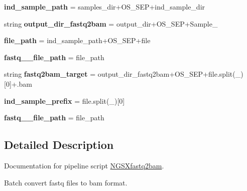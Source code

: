 \begin{DoxyCompactItemize}
\item 
{\bfseries ind\+\_\+sample\+\_\+path} = samples\+\_\+dir+O\+S\+\_\+\+S\+EP+ind\+\_\+sample\+\_\+dir\hypertarget{namespaceNGSXfastq2bam_a9e15a12f170cee194d3ddb857cd9eb90}{}\label{namespaceNGSXfastq2bam_a9e15a12f170cee194d3ddb857cd9eb90}

\item 
string {\bfseries output\+\_\+dir\+\_\+fastq2bam} = output\+\_\+dir+O\+S\+\_\+\+S\+EP+\textquotesingle{}Sample\+\_\+\textquotesingle{}\hypertarget{namespaceNGSXfastq2bam_a056b8c8bda81e50d71bde02b138bf02d}{}\label{namespaceNGSXfastq2bam_a056b8c8bda81e50d71bde02b138bf02d}

\item 
{\bfseries file\+\_\+path} = ind\+\_\+sample\+\_\+path+O\+S\+\_\+\+S\+EP+file\hypertarget{namespaceNGSXfastq2bam_aa54c2255c19ea6a87e63ddccdd97bcce}{}\label{namespaceNGSXfastq2bam_aa54c2255c19ea6a87e63ddccdd97bcce}

\item 
{\bfseries fastq\+\_\+\_\+file\+\_\+path} = file\+\_\+path\hypertarget{namespaceNGSXfastq2bam_a7e07e6cfe0a20940e18faf67fbc126cd}{}\label{namespaceNGSXfastq2bam_a7e07e6cfe0a20940e18faf67fbc126cd}

\item 
string {\bfseries fastq2bam\+\_\+target} = output\+\_\+dir\+\_\+fastq2bam+O\+S\+\_\+\+S\+EP+file.\+split(\textquotesingle{}\+\_\+\textquotesingle{})\mbox{[}0\mbox{]}+\textquotesingle{}.bam\textquotesingle{}\hypertarget{namespaceNGSXfastq2bam_aacfb7434907a2b45c466b5ba6eff1dd7}{}\label{namespaceNGSXfastq2bam_aacfb7434907a2b45c466b5ba6eff1dd7}

\item 
{\bfseries ind\+\_\+sample\+\_\+prefix} = file.\+split(\textquotesingle{}\+\_\+\textquotesingle{})\mbox{[}0\mbox{]}\hypertarget{namespaceNGSXfastq2bam_ae37b44984b816de0be0aa4788b4f22b2}{}\label{namespaceNGSXfastq2bam_ae37b44984b816de0be0aa4788b4f22b2}

\item 
{\bfseries fastq\+\_\+\_\+file\+\_\+path} = file\+\_\+path\hypertarget{namespaceNGSXfastq2bam_a64ed08a99a26a887ded39832d77d9536}{}\label{namespaceNGSXfastq2bam_a64ed08a99a26a887ded39832d77d9536}

\end{DoxyCompactItemize}


\subsection{Detailed Description}
Documentation for pipeline script \hyperlink{namespaceNGSXfastq2bam}{N\+G\+S\+Xfastq2bam}. 

Batch convert fastq files to bam format. 